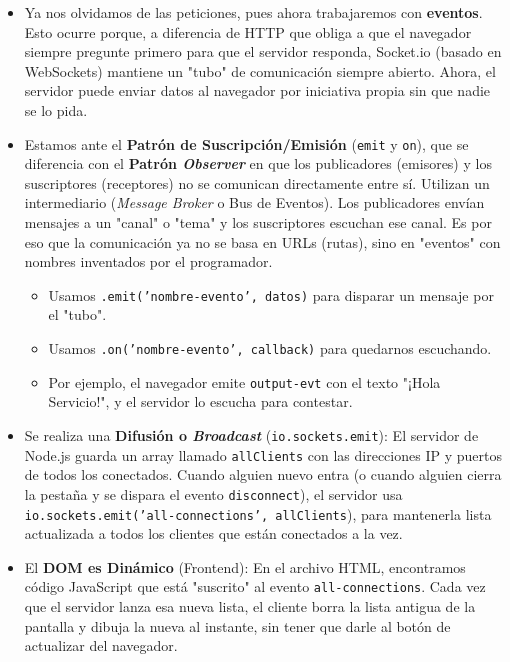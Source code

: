\documentclass[a4paper,12pt]{article}
\begin{document}
			\begin{itemize}
				 
			\item  Ya nos olvidamos de las peticiones, pues ahora trabajaremos con \textbf{eventos}. Esto ocurre porque, a diferencia de  HTTP que obliga a que el navegador siempre pregunte primero para que el servidor responda, Socket.io (basado en WebSockets) mantiene un "tubo" de comunicación siempre abierto. Ahora, el servidor puede enviar datos al navegador por iniciativa propia sin que nadie se lo pida.
			
			\item Estamos ante el \textbf{Patrón de Suscripción/Emisión} (\texttt{emit} y \texttt{on}), que se diferencia con el \textbf{Patrón \textit{Observer}} en que los publicadores (emisores) y los suscriptores (receptores) no se comunican directamente entre sí. Utilizan un intermediario (\textit{Message Broker} o Bus de Eventos). Los publicadores envían mensajes a un "canal" o "tema" y los suscriptores escuchan ese canal.
			Es por eso que la comunicación ya no se basa en URLs (rutas), sino en "eventos" con nombres inventados por el programador.
			\begin{itemize}
				\item  Usamos \texttt{.emit('nombre-evento', datos)} para disparar un mensaje por el "tubo".
				
				\item Usamos \texttt{.on('nombre-evento', callback)} para quedarnos escuchando.
				
				\item Por ejemplo, el navegador emite \texttt{output-evt} con el texto "¡Hola Servicio!", y el servidor lo escucha para contestar.
			\end{itemize}
			
			\item Se realiza una\textbf{ Difusión o \textit{Broadcast}} (\texttt{io.sockets.emit}): El servidor de Node.js guarda un array llamado \texttt{allClients} con las direcciones IP y puertos de todos los conectados. Cuando alguien nuevo entra (o cuando alguien cierra la pestaña y se dispara el evento \texttt{disconnect}), el servidor usa \texttt{io.sockets.emit('all-connections', allClients}), para mantenerla lista actualizada a todos los clientes que están conectados a la vez.
			
			\item El \textbf{DOM es Dinámico} (Frontend): En el archivo HTML, encontramos código JavaScript que está "suscrito" al evento \texttt{all-connections}. Cada vez que el servidor lanza esa nueva lista, el cliente borra la lista antigua de la pantalla y dibuja la nueva al instante, sin tener que darle al botón de actualizar del navegador.
			
		\end{itemize}
		
\end{document}
